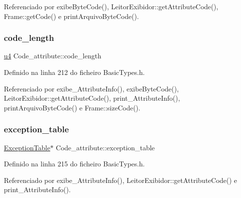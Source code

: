 Referenciado por exibe\+Byte\+Code(), Leitor\+Exibidor\+::get\+Attribute\+Code(), Frame\+::get\+Code() e print\+Arquivo\+Byte\+Code().

\mbox{\label{structCode__attribute_a80af47e824a13ef4dc604e5b8671f793}} 
\subsubsection{\texorpdfstring{code\+\_\+length}{code\_length}}
{\footnotesize\ttfamily \hyperlink{BasicTypes_8h_ae5be1f726785414dd1b77d60df074c9d}{u4} Code\+\_\+attribute\+::code\+\_\+length}



Definido na linha 212 do ficheiro Basic\+Types.\+h.



Referenciado por exibe\+\_\+\+Attribute\+Info(), exibe\+Byte\+Code(), Leitor\+Exibidor\+::get\+Attribute\+Code(), print\+\_\+\+Attribute\+Info(), print\+Arquivo\+Byte\+Code() e Frame\+::size\+Code().

\mbox{\label{structCode__attribute_a080b3f7a5717321484a648ec83c11f12}} 
\subsubsection{\texorpdfstring{exception\+\_\+table}{exception\_table}}
{\footnotesize\ttfamily \hyperlink{structExceptionTable}{Exception\+Table}$\ast$ Code\+\_\+attribute\+::exception\+\_\+table}



Definido na linha 215 do ficheiro Basic\+Types.\+h.



Referenciado por exibe\+\_\+\+Attribute\+Info(), Leitor\+Exibidor\+::get\+Attribute\+Code() e print\+\_\+\+Attribute\+Info().

\mbox{\label{structCode__attribute_a24b063ad994d77688db7468fae11e7aa}} 
